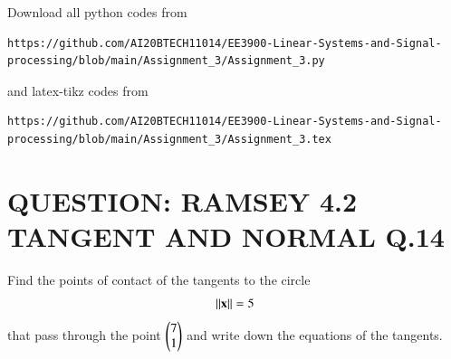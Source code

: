\documentclass[journal,12pt,twocolumn]{IEEEtran}
\begin{document}
\maketitle
\newpage
\bigskip
\renewcommand{\thefigure}{\theenumi}
\renewcommand{\thetable}{\theenumi}
Download all python codes from 
\begin{lstlisting}
https://github.com/AI20BTECH11014/EE3900-Linear-Systems-and-Signal-processing/blob/main/Assignment_3/Assignment_3.py
\end{lstlisting}
%
and latex-tikz codes from 
%
\begin{lstlisting}
https://github.com/AI20BTECH11014/EE3900-Linear-Systems-and-Signal-processing/blob/main/Assignment_3/Assignment_3.tex
\end{lstlisting}
\vspace{0.5cm}
\section{QUESTION: RAMSEY 4.2 TANGENT AND NORMAL Q.14}
 Find the points of contact of the tangents to
the circle
\begin{align}
\lVert\mathbf{x}\rVert=5 \label{eq:1}
\end{align}
that pass through the point $\begin{pmatrix}7 \\ 1\end{pmatrix}$ and write down the equations of the tangents.
\end{document}
